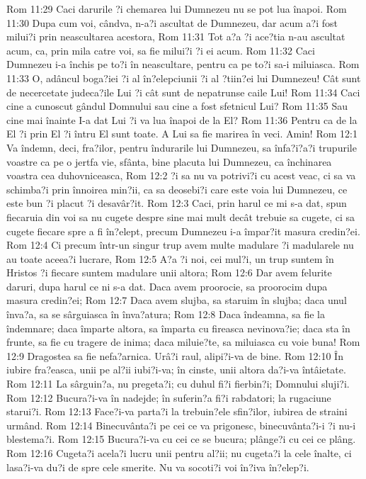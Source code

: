 Rom 11:29  Caci darurile ?i chemarea lui Dumnezeu nu se pot lua înapoi.
Rom 11:30  Dupa cum voi, cândva, n-a?i ascultat de Dumnezeu, dar acum a?i fost milui?i prin neascultarea acestora,
Rom 11:31  Tot a?a ?i ace?tia n-au ascultat acum, ca, prin mila catre voi, sa fie milui?i ?i ei acum.
Rom 11:32  Caci Dumnezeu i-a închis pe to?i în neascultare, pentru ca pe to?i sa-i miluiasca.
Rom 11:33  O, adâncul boga?iei ?i al în?elepciunii ?i al ?tiin?ei lui Dumnezeu! Cât sunt de necercetate judeca?ile Lui ?i cât sunt de nepatrunse caile Lui!
Rom 11:34  Caci cine a cunoscut gândul Domnului sau cine a fost sfetnicul Lui?
Rom 11:35  Sau cine mai înainte I-a dat Lui ?i va lua înapoi de la El?
Rom 11:36  Pentru ca de la El ?i prin El ?i întru El sunt toate. A Lui sa fie marirea în veci. Amin!
Rom 12:1  Va îndemn, deci, fra?ilor, pentru îndurarile lui Dumnezeu, sa înfa?i?a?i trupurile voastre ca pe o jertfa vie, sfânta, bine placuta lui Dumnezeu, ca închinarea voastra cea duhovniceasca,
Rom 12:2  ?i sa nu va potrivi?i cu acest veac, ci sa va schimba?i prin înnoirea min?ii, ca sa deosebi?i care este voia lui Dumnezeu, ce este bun ?i placut ?i desavâr?it.
Rom 12:3  Caci, prin harul ce mi s-a dat, spun fiecaruia din voi sa nu cugete despre sine mai mult decât trebuie sa cugete, ci sa cugete fiecare spre a fi în?elept, precum Dumnezeu i-a împar?it masura credin?ei.
Rom 12:4  Ci precum într-un singur trup avem multe madulare ?i madularele nu au toate aceea?i lucrare,
Rom 12:5  A?a ?i noi, cei mul?i, un trup suntem în Hristos ?i fiecare suntem madulare unii altora;
Rom 12:6  Dar avem felurite daruri, dupa harul ce ni s-a dat. Daca avem proorocie, sa proorocim dupa  masura credin?ei;
Rom 12:7  Daca avem slujba, sa staruim în slujba; daca unul înva?a, sa se sârguiasca în înva?atura;
Rom 12:8  Daca îndeamna, sa fie la îndemnare; daca împarte altora, sa împarta cu fireasca nevinova?ie; daca sta în frunte, sa fie cu tragere de inima; daca miluie?te, sa miluiasca cu voie buna!
Rom 12:9  Dragostea sa fie nefa?arnica. Urâ?i raul, alipi?i-va de bine.
Rom 12:10  În iubire fra?easca, unii pe al?ii iubi?i-va; în cinste, unii altora da?i-va întâietate.
Rom 12:11  La sârguin?a, nu pregeta?i; cu duhul fi?i fierbin?i; Domnului sluji?i.
Rom 12:12  Bucura?i-va în nadejde; în suferin?a fi?i rabdatori; la rugaciune starui?i.
Rom 12:13  Face?i-va parta?i la trebuin?ele sfin?ilor, iubirea de straini urmând.
Rom 12:14  Binecuvânta?i pe cei ce va prigonesc, binecuvânta?i-i ?i nu-i blestema?i.
Rom 12:15  Bucura?i-va cu cei ce se bucura; plânge?i cu cei ce plâng.
Rom 12:16  Cugeta?i acela?i lucru unii pentru al?ii; nu cugeta?i la cele înalte, ci lasa?i-va du?i de spre cele smerite. Nu va socoti?i voi în?iva în?elep?i.
